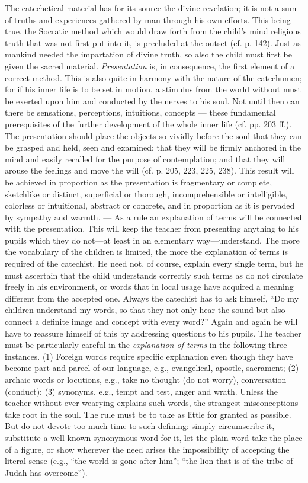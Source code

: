 The catechetical material has for its source the divine revelation; it is not a sum of truths and experiences gathered by man through his own efforts. This being true, the Socratic method which would draw forth from the child’s mind religious truth that was not first put into it, is precluded
at the outset (cf. p. 142). Just as mankind needed the impartation of divine truth, so also the child must first be given the sacred material. \emph{Presentation} is, in consequence, the first element of a correct method. This is also quite in harmony with the nature of the catechumen; for if his inner life is to be set in motion, a stimulus from the world without must be exerted upon him and conducted by the nerves to his soul. Not until then can there be sensations, perceptions, intuitions, concepts — these fundamental prerequisites of the further development of the whole inner life (cf. pp. 203 ff.). The presentation should place the objects so vividly before the soul that they can be grasped and held, seen and examined; that they will be firmly anchored in the mind and easily recalled for the purpose of contemplation; and that they will arouse the feelings and move the will (cf. p. 205, 223, 225, 238). This result will be achieved in proportion as the presentation is fragmentary or complete, sketchlike or distinct, superficial or thorough, incomprehensible or intelligible, colorless or intuitional, abstract or concrete, and in proportion as it is pervaded by sympathy and warmth. — As a rule an explanation of terms will be connected with the presentation. This will keep the teacher from presenting anything to his pupils which they do not—at least in an elementary way—understand. The more the vocabulary of the children is limited, the more the explanation of terms is required of the catechist. He need not, of course, explain every single term, but he must ascertain that the child understands correctly such terms as do not circulate freely in his environment, or words that in local usage have acquired a meaning different from the accepted one. Always the catechist has to ask himself, “Do my children understand my words, so that they not only hear the sound but also connect a definite image and concept with every word?” Again and again he will have to reassure himself of this by addressing questions to
his pupils. The teacher must be particularly careful in the \emph{explanation of terms} in the following three instances. (1) Foreign words require specific explanation even though they have become part and parcel of our language, e.g., evangelical, apostle, sacrament; (2) archaic words or locutions, e.g., take no thought (do not worry), conversation (conduct); (3) synonyms, e.g., tempt and test, anger and wrath. Unless the teacher without ever wearying explains such words, the strangest misconceptions take root in the soul. The rule must be to take as little for granted as possible. But do not devote too much time to such defining: simply circumscribe it, substitute a well known synonymous word for it, let the plain word take the place of a figure, or show wherever the need arises the impossibility of accepting the literal sense (e.g., “the world is gone after him”; “the lion that is of the tribe of Judah has overcome”).

